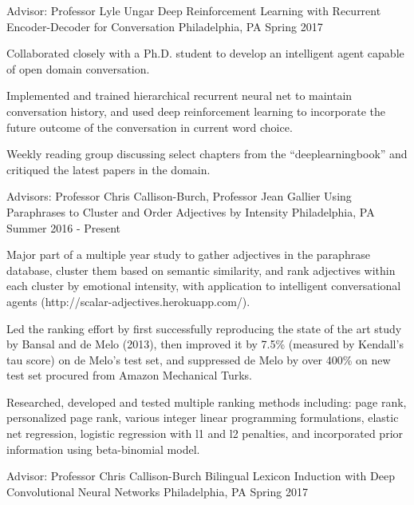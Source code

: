 \begin{cventries}
  \cventry
    {Advisor: Professor Lyle Ungar}
    {Deep Reinforcement Learning with Recurrent Encoder-Decoder for Conversation}
    {Philadelphia, PA}
    {Spring 2017}
    {
      \begin{cvitems}
        \item {Collaborated closely with a Ph.D. student to develop an intelligent agent capable of open domain conversation.}
        \item {Implemented and trained hierarchical recurrent neural net to maintain conversation history, and used deep reinforcement learning to incorporate the future outcome of the conversation in current word choice.}
        \item {Weekly reading group discussing select chapters from the “deeplearningbook” and critiqued the latest papers in the domain.}
      \end{cvitems}
    }
  \cventry
    {Advisors: Professor Chris Callison-Burch, Professor Jean Gallier}
    {Using Paraphrases to Cluster and Order Adjectives by Intensity}
    {Philadelphia, PA}
    {Summer 2016 - Present}
    {
      \begin{cvitems}
        \item {Major part of a multiple year study to gather adjectives in the paraphrase database, cluster them based on semantic similarity, and rank adjectives within each cluster by emotional intensity, with application to intelligent conversational agents  (http://scalar-adjectives.herokuapp.com/).}
        \item {Led the ranking effort by first successfully reproducing the state of the art study by Bansal and de Melo (2013), then improved it by 7.5\% (measured by Kendall's tau score) on de Melo’s test set, and suppressed de Melo by over 400\% on new test set procured from Amazon Mechanical Turks.}
        \item {Researched, developed and tested multiple ranking methods including: page rank, personalized page rank, various integer linear programming formulations, elastic net regression, logistic regression with l1 and l2 penalties, and incorporated prior information using beta-binomial model.}
      \end{cvitems}
    }
  \cventry
    {Advisor: Professor Chris Callison-Burch}
    {Bilingual Lexicon Induction with Deep Convolutional Neural Networks}
    {Philadelphia, PA}
    {Spring 2017}

\end{cventries}

